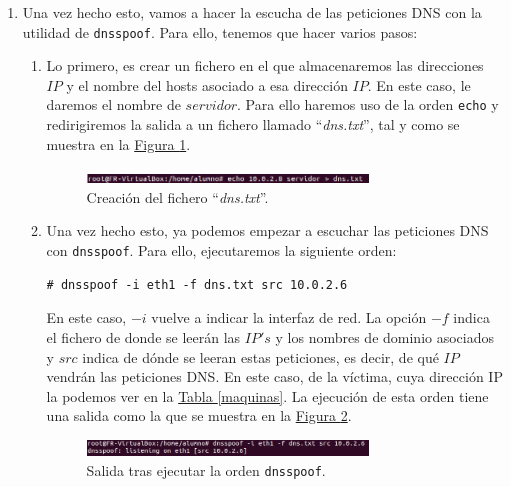 \documentclass[10pt,a4paper,spanish]{article}
\begin{document}
\begin{enumerate}
    \item Una vez hecho esto, vamos a hacer la escucha de las peticiones DNS con la utilidad de \texttt{dnsspoof}. Para ello, tenemos que hacer varios pasos:
    \begin{enumerate}
        \item Lo primero, es crear un fichero en el que almacenaremos las direcciones $IP$ y el nombre del hosts asociado a esa dirección $IP$. En este caso, le daremos el nombre de $servidor$. Para ello haremos uso de la orden \texttt{echo} y redirigiremos la salida a un fichero llamado ``\textit{dns.txt}'', tal y como se muestra en la \hyperref[ataque2]{Figura \ref*{ataque2}}.
        \begin{figure}[!h]
            \centering
            \includegraphics[width=0.75\textwidth]{ataque2}
            \caption{Creación del fichero ``\textit{dns.txt}''.}
            \label{ataque2}
        \end{figure}
        \item Una vez hecho esto, ya podemos empezar a escuchar las peticiones DNS con \texttt{dnsspoof}. Para ello, ejecutaremos la siguiente orden:\\
\begin{verbatim}
# dnsspoof -i eth1 -f dns.txt src 10.0.2.6
\end{verbatim}

    En este caso, $-i$ vuelve a indicar la interfaz de red. La opción $-f$ indica el fichero de donde se leerán las $IP's$ y los nombres de dominio asociados y $src$ indica de dónde se leeran estas peticiones, es decir, de qué $IP$ vendrán las peticiones DNS. En este caso, de la víctima, cuya dirección IP la podemos ver en la \hyperref[maquinas]{Tabla \ref*{maquinas}}. La ejecución de esta orden tiene una salida como la que se muestra en la \hyperref[ataque3]{Figura \ref*{ataque3}}.

    \begin{figure}[!h]
        \centering
        \includegraphics[width=0.75\textwidth]{ataque3}
        \caption{Salida tras ejecutar la orden \texttt{dnsspoof}.}
        \label{ataque3}
    \end{figure}

    \end{enumerate}
    

\end{enumerate}
\end{document}

